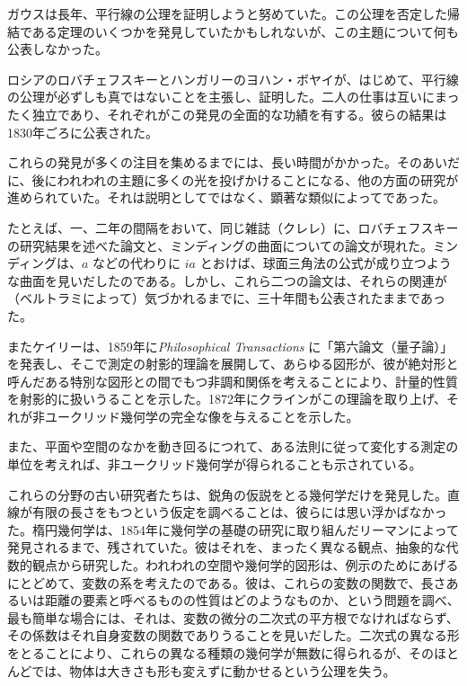 ガウスは長年、平行線の公理を証明しようと努めていた。この公理を否定した帰結である定理のいくつかを発見していたかもしれないが、この主題について何も公表しなかった。

ロシアのロバチェフスキーとハンガリーのヨハン・ボヤイが、はじめて、平行線の公理が必ずしも真ではないことを主張し、証明した。二人の仕事は互いにまったく独立であり、それぞれがこの発見の全面的な功績を有する。彼らの結果は1830年ごろに公表された。

これらの発見が多くの注目を集めるまでには、長い時間がかかった。そのあいだに、後にわれわれの主題に多くの光を投げかけることになる、他の方面の研究が進められていた。それは説明としてではなく、顕著な類似によってであった。

たとえば、一、二年の間隔をおいて、同じ雑誌（クレレ）に、ロバチェフスキーの研究結果を述べた論文と、ミンディングの曲面についての論文が現れた。ミンディングは、$a$ などの代わりに $ia$ とおけば、球面三角法の公式が成り立つような曲面を見いだしたのである。しかし、これら二つの論文は、それらの関連が（ベルトラミによって）気づかれるまでに、三十年間も公表されたままであった。

またケイリーは、1859年に\emph{Philosophical Transactions} に「第六論文（量子論）」を発表し、そこで測定の射影的理論を展開して、あらゆる図形が、彼が絶対形と呼んだある特別な図形との間でもつ非調和関係を考えることにより、計量的性質を射影的に扱いうることを示した。1872年にクラインがこの理論を取り上げ、それが非ユークリッド幾何学の完全な像を与えることを示した。

また、平面や空間のなかを動き回るにつれて、ある法則に従って変化する測定の単位を考えれば、非ユークリッド幾何学が得られることも示されている。

これらの分野の古い研究者たちは、鋭角の仮説をとる幾何学だけを発見した。直線が有限の長さをもつという仮定を調べることは、彼らには思い浮かばなかった。楕円幾何学は、1854年に幾何学の基礎の研究に取り組んだリーマンによって発見されるまで、残されていた。彼はそれを、まったく異なる観点、抽象的な代数的観点から研究した。われわれの空間や幾何学的図形は、例示のためにあげるにとどめて、変数の系を考えたのである。彼は、これらの変数の関数で、長さあるいは距離の要素と呼べるものの性質はどのようなものか、という問題を調べ、最も簡単な場合には、それは、変数の微分の二次式の平方根でなければならず、その係数はそれ自身変数の関数でありうることを見いだした。二次式の異なる形をとることにより、これらの異なる種類の幾何学が無数に得られるが、そのほとんどでは、物体は大きさも形も変えずに動かせるという公理を失う。

